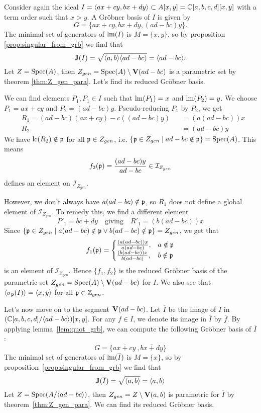 \begin{example}\upshape
  Consider again the ideal $I = \langle ax + cy, bx + dy \rangle \subset A[x, y] = \mathbb{C}[a, b, c, d][x, y]$ with a term order such that $x > y$. A Gröbner basis of $I$ is given by
  \[G = \{ax + cy, bx + dy, (ad - bc)y\}.\]
  The minimal set of generators of $\operatorname{lm}(I)$ is $M = \{x, y\}$, so by proposition \ref{prop:singular_from_grb} we find that
  \[\operatorname{\mathbf J}(I) = \sqrt{\langle a, b \rangle \langle ad - bc \rangle} = \langle ad - bc \rangle.\]
  Let $Z = \operatorname{Spec}(A)$, then $Z_{gen} = \operatorname{Spec}(A) \setminus \operatorname{\mathbf V}(ad - bc)$ is a parametric set by theorem \ref{thm:Z_gen_para}. Let's find its reduced Gröbner basis.

  We can find elements $P_{1}, P_{1} \in I$ such that $\operatorname{lm}(P_{1}) = x$ and $\operatorname{lm}(P_{2}) = y$. We choose $P_{1} = ax + cy$ and $P_{2} = (ad - bc)y$. Pseudo-reducing $P_{1}$ by $P_{2}$, we get
  \begin{align*}
    &R_{1} = (ad - bc)(ax + cy) - c((ad - bc)y) &&= (a(ad - bc))x \\
    &R_{2} &&= (ad - bc)y
  \end{align*}
  We have $\operatorname{lc}(R_{2}) \notin \mathfrak p$ for all $\mathfrak p \in Z_{gen}$, i.e. $\{\mathfrak p \in Z_{gen} \mid ad - bc \notin \mathfrak p\} = \operatorname{Spec}(A)$. This means
  \[f_{2}(\mathfrak p) = \frac{(ad - bc)y}{ad - bc} \in \mathcal I_{Z_{gen}}\]
  defines an element on $\mathcal I_{Z_{gen}}$.

  However, we don't always have $a(ad - bc) \notin \mathfrak p$, so $R_{1}$ does not define a global element of $\mathcal I_{Z_{gen}}$. To remedy this, we find a different element
  \[P'_{1} = bc + dy \quad \text{giving} \quad R'_{1} = (b(ad - bc))x\]
  Since $\{\mathfrak p \in Z_{gen} \mid a(ad - bc) \notin \mathfrak p \lor b(ad - bc) \notin \mathfrak p\} = Z_{gen}$, we get that
  \[f_{1}(\mathfrak p) =
    \begin{cases}
      \frac{(a(ad - bc))x}{a(ad - bc)},  & a \notin \mathfrak p \\
      \frac{(b(ad - bc))x}{b(ad - bc)},  & b \notin \mathfrak p
    \end{cases}
  \]
  is an element of $\mathcal I_{Z_{gen}}$. Hence $\{f_{1}, f_{2}\}$ is the reduced Gröbner basis of the parametric set $Z_{gen} = \operatorname{Spec}(A) \setminus \operatorname{\mathbf V}(ad - bc)$ for $I$. We also see that $\langle \sigma_{\mathfrak p}(I) \rangle = \langle x, y \rangle$ for all $\mathfrak p \in \mathbb{Z}_{gen}$.

  Let's now move on to the segment $\operatorname{\mathbf V}(ad - bc)$. Let $\overline I$ be the image of $I$ in $(\mathbb{C}[a, b, c, d]/\langle ad - bc \rangle)[x, y]$. For any $f \in I$, we denote its image in $\overline I$ by $\overline f$. By applying lemma~\ref{lem:quot_grb}, we can compute the following Gröbner basis of $\overline I$:
  \[G = \{\overline{ax + cy^{~}}, \overline{bx + dy}\}\]
  The minimal set of generators of $\operatorname{lm}(\overline I)$ is $M = \{x\}$, so by proposition~\ref{prop:singular_from_grb} we find that
  \[\operatorname{\mathbf J}(\overline I) = \sqrt{\langle a, b \rangle} = \langle a, b \rangle\]
  Let $Z = \operatorname{Spec}(A/\langle ad - bc \rangle)$, then $Z_{gen} = Z \setminus \operatorname{\mathbf V}(a, b)$ is parametric for $\overline I$ by theorem~\ref{thm:Z_gen_para}. We can find its reduced Gröbner basis.


\end{example}
